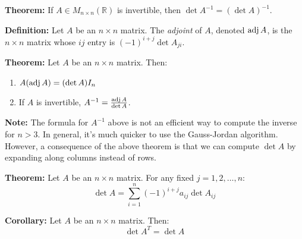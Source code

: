 \documentclass{article}
\begin{document}
\begin{minipage}[t]{0.45\linewidth}
        \textbf{Theorem:} If $A \in M_{n\times n}(\mathbb{R})$ is invertible, then $\det A^{-1} = (\det A)^{-1}$.
        \vspace{2mm}

        \textbf{Definition:} Let $A$ be an $n\times n$ matrix. The \textit{adjoint} of $A$, denoted $\mathrm{adj}\,A$, is the $n\times n$ matrix whose $ij$ entry is $(-1)^{i+j}\det A_{ji}$.
        \vspace{2mm}

        \textbf{Theorem:} Let $A$ be an $n\times n$ matrix. Then:
        \begin{enumerate}
            \item $A(\mathrm{adj}\,A) = (\det A)I_n$
            \item If $A$ is invertible, $A^{-1} = \frac{\mathrm{adj}\,A}{\det A}$.
        \end{enumerate}
        \vspace{2mm}

        \textbf{Note:} The formula for $A^{-1}$ above is not an efficient way to compute the inverse for $n>3$. In general, it's much quicker to use the Gauss-Jordan algorithm. However, a consequence of the above theorem is that we can compute $\det A$ by expanding along columns instead of rows.
        \vspace{2mm}

        \textbf{Theorem:} Let $A$ be an $n\times n$ matrix. For any fixed $j=1,2,\dots,n$:
        \begin{equation*}
            \det A = \sum_{i=1}^n (-1)^{i+j} a_{ij}\det A_{ij}
        \end{equation*}
        \vspace{2mm}

        \textbf{Corollary:} Let $A$ be an $n\times n$ matrix. Then:
        \begin{equation*}
            \det A^T = \det A
        \end{equation*}
    \end{minipage}
    \newpage
\end{document}

